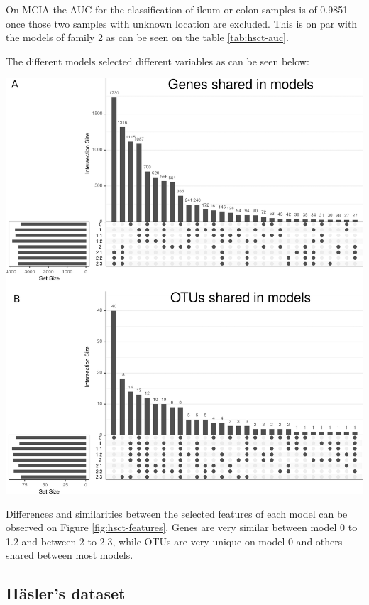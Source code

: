 \documentclass[
  12pt,
  a4paper,
  twoside,
  openright]{book}
\let\origfigure\figure
\let\endorigfigure\endfigure
\renewenvironment{figure}[1][2] {
    \expandafter\origfigure\expandafter[!htp]
} {
    \endorigfigure
}
\begin{document}
On MCIA the AUC for the classification of ileum or colon samples is of 0.9851 once those two samples with unknown location are excluded.
This is on par with the models of family 2 as can be seen on the table \ref{tab:hsct-auc}.

The different models selected different variables as can be seen below:

\begin{figure}
\includegraphics[width=1\linewidth]{images/hsct-features} \caption[Upset plot of variables selected on the HSCT dataset.]{Upset plot of variables selected on the HSCT dataset. The variables selected on each model from 0 to 2.3 showing the intersection between them regarding genes, panel A, and OTUs, panel B.}\label{fig:hsct-features}
\end{figure}

Differences and similarities between the selected features of each model can be observed on Figure \ref{fig:hsct-features}.
Genes are very similar between model 0 to 1.2 and between 2 to 2.3, while OTUs are very unique on model 0 and others shared between most models.

\hypertarget{results-hasler}{%
\subsection{Häsler's dataset}\label{results-hasler}}
\end{document}
